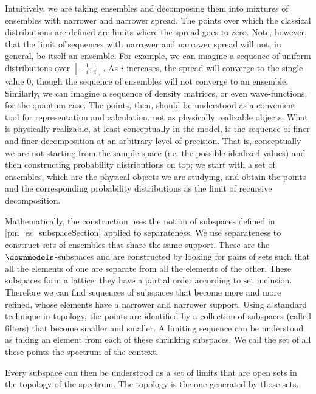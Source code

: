 Intuitively, we are taking ensembles and decomposing them into mixtures of ensembles with narrower and narrower spread. The points over which the classical distributions are defined are limits where the spread goes to zero. Note, however, that the limit of sequences with narrower and narrower spread will not, in general, be itself an ensemble. For example, we can imagine a sequence of uniform distributions over $[-\frac{1}{i}, \frac{1}{i}]$. As $i$ increases, the spread will converge to the single value $0$, though the sequence of ensembles will not converge to an ensemble. Similarly, we can imagine a sequence of density matrices, or even wave-functions, for the quantum case. The points, then, should be understood as a convenient tool for representation and calculation, not as physically realizable objects. What is physically realizable, at least conceptually in the model, is the sequence of finer and finer decomposition at an arbitrary level of precision. That is, conceptually we are not starting from the sample space (i.e. the possible idealized values) and then constructing probability distributions on top; we start with a set of ensembles, which are the physical objects we are studying, and obtain the points and the corresponding probability distributions as the limit of recursive decomposition.

Mathematically, the construction uses the notion of subspaces defined in \ref{pm_es_subspaceSection} applied to separateness. We use separateness to construct sets of ensembles that share the same support. These are the $\separate$-subspaces and are constructed by looking for pairs of sets such that all the elements of one are separate from all the elements of the other. These subspaces form a lattice: they have a partial order according to set inclusion. Therefore we can find sequences of subspaces that become more and more refined, whose elements have a narrower and narrower support. Using a standard technique in topology, the points are identified by a collection of subspaces (called filters) that become smaller and smaller. A limiting sequence can be understood as taking an element from each of these shrinking subspaces. We call the set of all these points the spectrum of the context.

Every subspace can then be understood as a set of limits that are open sets in the topology of the spectrum. The topology is the one generated by those sets.


